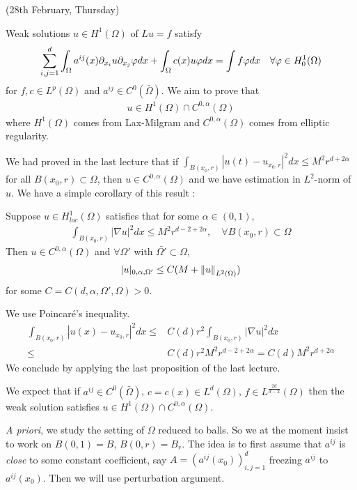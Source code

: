 \documentclass[12pt,a4paper]{article}
\newenvironment{proof}
{\begin{changemargin}{0.5cm}{0.5cm} 
	}%
	{\end{changemargin}
}
\newenvironment{p}
{\begin{proof} 
	}%
	{\end{proof}
}
\begin{document}
\newday

(28th February, Thursday)
\s

Weak solutions $u\in H^1(\Omega)$ of $Lu = f$ satisfy
\begin{align*}
\sum_{i,j=1}^d \int_{\Omega} a^{ij}(x) \partial_{x_i} u \partial_{x_j} \varphi dx + \int_{\Omega} c(x) u\varphi dx = \int f\varphi dx \quad \forall \varphi \in H_0^1(\Omega)
\end{align*}
for $f,c \in L^p(\Omega)$ and $a^{ij} \in C^0(\bar{\Omega})$. We aim to prove that
\begin{align*}
u\in H^1(\Omega) \cap C^{0, \alpha}(\Omega)
\end{align*}
where $H^1(\Omega)$ comes from Lax-Milgram and $C^{0, \alpha}(\Omega)$ comes from elliptic regularity. 

\quad We had proved in the last lecture that if $\int_{B(x_0, r)} |u(t) - u_{x_0, r}|^2 dx \leq M^2 r^{d+2\alpha}$ for all $B(x_0, r) \subset \Omega$, then $u\in C^{0, \alpha}(\Omega)$ and we have estimation in $L^2$-norm of $u$. We have a simple corollary of this result :
\s

\corr Suppose $u\in H^1_{loc} (\Omega)$ satisfies that for some $\alpha \in (0,1)$,
\begin{align*}
\int_{B(x_0, r)} |\nabla u|^2 dx \leq M^2 r^{d-2 + 2\alpha}, \quad \forall B(x_0, r) \subset \Omega
\end{align*}
Then $u\in C^{0, \alpha}(\Omega)$ and $\forall \Omega'$ with $\bar{\Omega'} \subset \Omega$,
\begin{align*}
|u|_{0, \alpha, \Omega'} \leq C(M + \snorms{u}{L^2(\Omega)})
\end{align*}
for some $C = C(d, \alpha, \Omega', \Omega) >0$.
\begin{p}
\pf We use Poincar\'e's inequality.
\begin{align*}
\int_{B(x_0, r)} |u(x) - u_{x_0, r}|^2 dx \leq & C(d) r^2 \int_{B(x_0, r)} |\nabla u|^2 dx \\
\leq & C(d) r^2 M^2 r^{d-2+2\alpha} = C(d) M^2 r^{d+ 2\alpha}
\end{align*}
We conclude by applying the last proposition of the last lecture.

\eop 
\end{p}
\s

We expect that if $a^{ij} \in C^0(\bar{\Omega})$, $c =c(x) \in L^d(\Omega)$, $f\in L^{\frac{2d}{d-2}}(\Omega)$ then the weak solution satisfies $u\in H^1(\Omega) \cap C^{0, \alpha}(\Omega)$.
\s

\textit{A priori}, we study the setting of $\Omega$ reduced to balls. So we at the moment insist to work on $B(0, 1) =B$, $B(0, r)=B_r$. The idea is to first assume that $a^{ij}$ is \emph{close} to some constant coefficient, say $A = (a^{ij}(x_0))_{i,j=1}^d$ freezing $a^{ij}$ to $a^{ij}(x_0)$. Then we will use perturbation argument.
\end{document}
